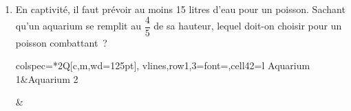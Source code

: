 \documentclass{article}
\begin{document}
    \begin{enumerate}
        \item En captivité, il faut prévoir au moins 15 litres d'eau pour un
        poisson. Sachant qu'un aquarium se remplit au $\dfrac45$ de sa hauteur,
        lequel doit-on choisir pour un poisson combattant~?\par\smallskip\noindent
    \begin{minipage}{.5\linewidth}
        \begin{tblr}{%
                colspec=*{2}{Q[c,m,wd=125pt]},
                vlines,row{1,3}={font=\bfseries},cell{4}{2}={l}
                }
            \hline
            Aquarium 1&Aquarium 2\\
            &
\end{tblr}
\end{minipage}
\end{enumerate}
\end{document}
